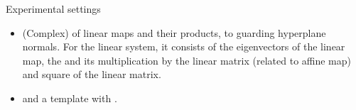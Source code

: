 \begin{frame}{Experimental settings}
%
\begin{itemize}
\item {}  (Complex)  of linear maps and their products,
  to guarding hyperplane normals.  For
the linear system, it consists of the eigenvectors of the linear map,
the  and its multiplication by the linear matrix
(related to affine map) and square of the linear matrix. 
\item {}   and a
template with .
\end{itemize}
%
\end{frame}


